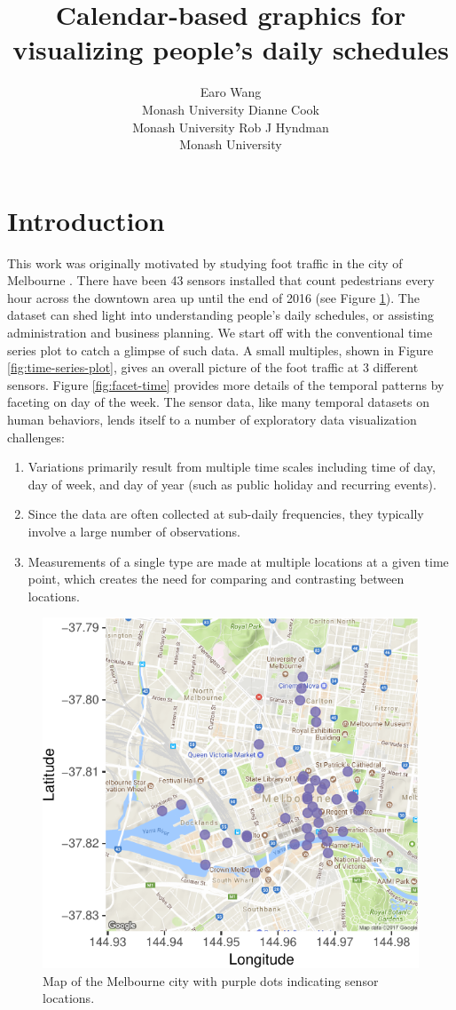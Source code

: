 \documentclass[article]{jss}
\author{
Earo Wang\\Monash University \And Dianne Cook\\Monash University \And Rob J Hyndman\\Monash University
}
\title{Calendar-based graphics for visualizing people's daily schedules}
\providecommand{\tightlist}{%
  \setlength{\itemsep}{0pt}\setlength{\parskip}{0pt}}
\theoremstyle{definition}
\theoremstyle{definition}
\theoremstyle{remark}
\begin{document}
\section{Introduction}\label{introduction}

This work was originally motivated by studying foot traffic in the city
of Melbourne \citep{ped}. There have been 43 sensors installed that
count pedestrians every hour across the downtown area up until the end
of 2016 (see Figure \ref{fig:ped-map}). The dataset can shed light into
understanding people's daily schedules, or assisting administration and
business planning. We start off with the conventional time series plot
to catch a glimpse of such data. A small multiples, shown in Figure
\ref{fig:time-series-plot}, gives an overall picture of the foot traffic
at 3 different sensors. Figure \ref{fig:facet-time} provides more
details of the temporal patterns by faceting on day of the week. The
sensor data, like many temporal datasets on human behaviors, lends
itself to a number of exploratory data visualization challenges:

\begin{enumerate}
\def\labelenumi{\arabic{enumi}.}
\tightlist
\item
  Variations primarily result from multiple time scales including time
  of day, day of week, and day of year (such as public holiday and
  recurring events).
\item
  Since the data are often collected at sub-daily frequencies, they
  typically involve a large number of observations.
\item
  Measurements of a single type are made at multiple locations at a
  given time point, which creates the need for comparing and contrasting
  between locations.
\end{enumerate}

\begin{CodeChunk}
\begin{figure}

{\centering \includegraphics[width=0.55\linewidth]{figure/ped-map-1} 

}

\caption[Map of the Melbourne city with purple dots indicating
sensor locations.]{Map of the Melbourne city with purple dots indicating
sensor locations.}\label{fig:ped-map}
\end{figure}
\end{CodeChunk}
\end{document}
